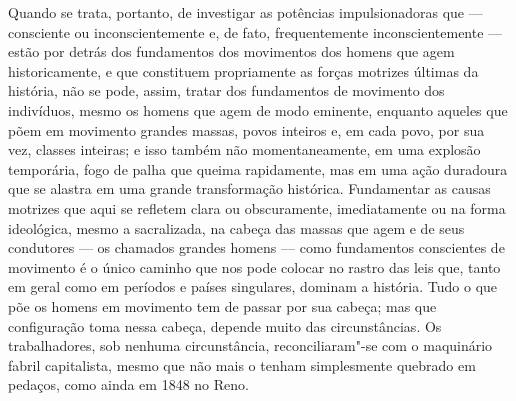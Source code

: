 Quando se trata, portanto, de investigar as potências impulsionadoras
que --- consciente ou inconscientemente e, de fato, frequentemente %
inconscientemente --- estão por detrás dos fundamentos dos movimentos dos
homens que agem historicamente, e que constituem propriamente as forças %
motrizes últimas da história, não se pode, assim, tratar dos fundamentos %
de movimento dos indivíduos, mesmo os homens que agem de modo eminente, %
enquanto aqueles que põem em movimento grandes massas, povos inteiros e,
em cada povo, por sua vez, classes inteiras; e isso também não
momentaneamente, em uma explosão temporária, fogo de palha que queima %
rapidamente, mas em uma ação duradoura que se alastra em uma grande
transformação histórica. Fundamentar as causas motrizes que aqui se
refletem clara ou obscuramente, imediatamente ou na forma ideológica,
mesmo a sacralizada, na cabeça das massas que agem e de seus condutores
--- os chamados grandes homens --- como fundamentos conscientes de movimento
é o único caminho que nos pode colocar no rastro das leis que, tanto
em geral como em períodos e países singulares, dominam a história. Tudo
o que põe os homens em movimento tem de passar por sua cabeça; mas que
configuração toma nessa cabeça, depende muito das circunstâncias. Os
trabalhadores, sob nenhuma circunstância, reconciliaram"-se com o
maquinário fabril capitalista, mesmo que não mais o tenham simplesmente
quebrado em pedaços, como ainda em 1848 no Reno.

